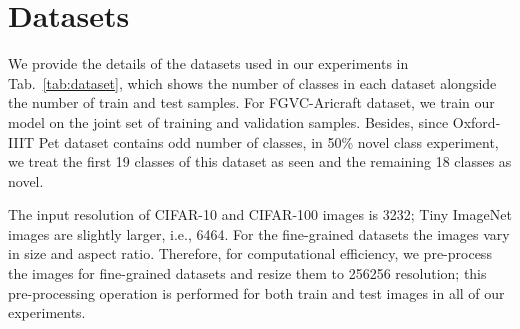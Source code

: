 \documentclass[runningheads]{eccv2022submission}
\begin{document}
\section{Datasets}
\label{sec:dataset}
We provide the details of the datasets used in our experiments in Tab.~\ref{tab:dataset}, which shows the number of classes in each dataset alongside the number of train and test samples. For FGVC-Aricraft\cite{maji13fine-grained} dataset, we train our model on the joint set of training and validation samples. Besides, since Oxford-IIIT Pet dataset contains odd number of classes, in 50\% novel class experiment, we treat the first 19 classes of this dataset as seen and the remaining 18 classes as novel.   


The input resolution of CIFAR-10 and CIFAR-100 images is 3232; Tiny ImageNet images are slightly larger, i.e., 6464. For the fine-grained datasets the images vary in size and aspect ratio. Therefore, for computational efficiency, we pre-process the images for fine-grained datasets and resize them to 256256 resolution; this pre-processing operation is performed for both train and test images in all of our experiments.
\end{document}
